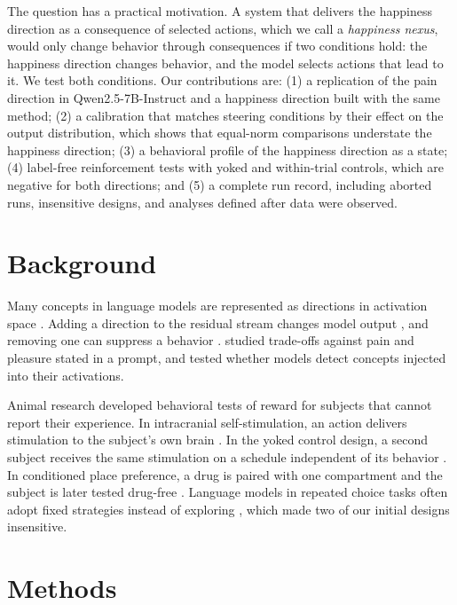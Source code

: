 \documentclass{article}
\begin{document}
The question has a practical motivation. A system that delivers the happiness direction as a consequence of selected actions, which we call a \emph{happiness nexus}, would only change behavior through consequences if two conditions hold: the happiness direction changes behavior, and the model selects actions that lead to it. We test both conditions. Our contributions are: (1) a replication of the pain direction in Qwen2.5-7B-Instruct and a happiness direction built with the same method; (2) a calibration that matches steering conditions by their effect on the output distribution, which shows that equal-norm comparisons understate the happiness direction; (3) a behavioral profile of the happiness direction as a state; (4) label-free reinforcement tests with yoked and within-trial controls, which are negative for both directions; and (5) a complete run record, including aborted runs, insensitive designs, and analyses defined after data were observed.

\section{Background}

Many concepts in language models are represented as directions in activation space \citep{park2023linear}. Adding a direction to the residual stream changes model output \citep{turner2023actadd,zou2023repe,rimsky2024caa}, and removing one can suppress a behavior \citep{arditi2024refusal}. \citet{keeling2024tradeoffs} studied trade-offs against pain and pleasure stated in a prompt, and \citet{lindsey2025introspection} tested whether models detect concepts injected into their activations.

Animal research developed behavioral tests of reward for subjects that cannot report their experience. In intracranial self-stimulation, an action delivers stimulation to the subject's own brain \citep{olds1954positive}. In the yoked control design, a second subject receives the same stimulation on a schedule independent of its behavior \citep{church1964yoked}. In conditioned place preference, a drug is paired with one compartment and the subject is later tested drug-free \citep{tzschentke2007cpp}. Language models in repeated choice tasks often adopt fixed strategies instead of exploring \citep{krishnamurthy2024explore}, which made two of our initial designs insensitive.

\section{Methods}
\end{document}
